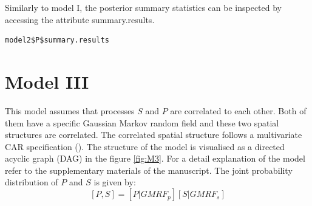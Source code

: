 \documentclass[11pt]{article}
\begin{document}
Similarly to model I, the posterior summary statistics can be inspected by accessing the attribute summary.results.

\begin{verbatim}
model2$P$summary.results
\end{verbatim}

\section{Model III}
\label{sec:org959c3de}
This model assumes that processes \(S\) and \(P\) are correlated to each other. Both of them have a specific Gaussian Markov random field and these two spatial structures are correlated. The correlated spatial structure follows a multivariate CAR specification (\cite{kavanagh2016,Lee2013}). The structure of the model is visualised as a directed acyclic graph (DAG) in the figure \ref{fig:M3}.  For a detail explanation of the model refer to the supplementary materials of the manuscript.
The joint probability distribution of \(P\) and \(S\) is given by:
 $$ [P , S ] = [P | GMRF_p] [ S | GMRF_s] $$
\end{document}
